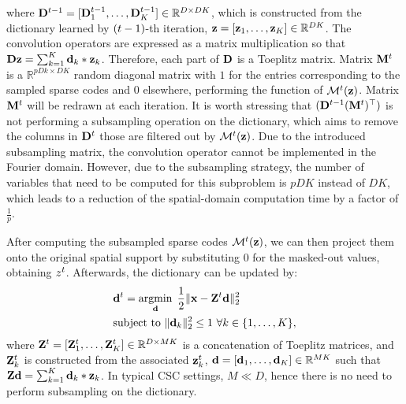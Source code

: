 where $\Filter^{\ite-1} = [\Filter_1^{\ite-1}, \dots, \Filter_K^{\ite-1}] \in \mathbb{R}^{D
  \times DK}$, which is constructed from the dictionary learned by
$(t-1)$-th iteration, $\code = [\code_1, \dots, \code_K] \in
\mathbb{R}^{DK}$. The convolution operators are expressed as a matrix
multiplication so that $ \Filter \code = \sum_{k=1}^{K} \filter_k *
\code_k$. Therefore, each part of $\Filter$ is a Toeplitz
matrix. Matrix $\mask^{\ite}$ is a $\mathbb{R}^{pDk \times DK}$ random
diagonal matrix with $1$ for the entries corresponding to the sampled
sparse codes and $0$ elsewhere, performing the function of
$\mathcal{M}^{\ite}(\code)$. Matrix $\mask^{\ite}$ will be redrawn at each
iteration. It is worth stressing that $(\Filter^{\ite-1} (\mask^{\ite})^\top)$ is not
performing a subsampling operation on the dictionary,  which aims to remove the columns in $\Filter^{\ite}$ those are filtered out
by $\mathcal{M}^{\ite}(\code)$.
Due to the introduced subsampling matrix, the
convolution operator cannot be implemented in the Fourier
domain. However, due to the subsampling
strategy, the number of variables that need to be computed for this
subproblem is $pDK$ instead of $DK$, which leads to a reduction
of the spatial-domain computation time by a factor of $\frac{1}{p}$.

After computing the subsampled sparse codes $\mathcal{M}^{\ite}(\code)$, we can then project them
onto the original spatial support by substituting $0$ for the
masked-out values, obtaining $z^{t}$. Afterwards, the dictionary can be updated by:
\begin{equation} \label{eq:updatingFilter}
\begin{split}
   & \filter^{\ite} = \minimize{\filter} \frac{1}{2}\|\signal - \Code^{\ite} \filter \|_2^2 \\
   & \text{subject to}  ~ \|\filter_k\|^2_2 \leq 1 ~ \forall k \in \{1,\dots,K\},
\end{split}
\end{equation}
 where $\Code^{\ite}= [\Code_1^{\ite}, \dots, \Code_K^{\ite}]
\in \mathbb{R}^{D \times MK}$ is a concatenation of Toeplitz matrices,
and $\Code_k^{\ite}$ is constructed from the associated $\code_k^{\ite}$, $\filter=
[\filter_1,\dots,\filter_K] \in \mathbb{R}^{MK}$ such that $ \Code
\filter = \sum_{k=1}^{K} \filter_k * \code_k$. In typical CSC
settings, $M \ll D$, hence there is no need to perform subsampling on
the dictionary.

